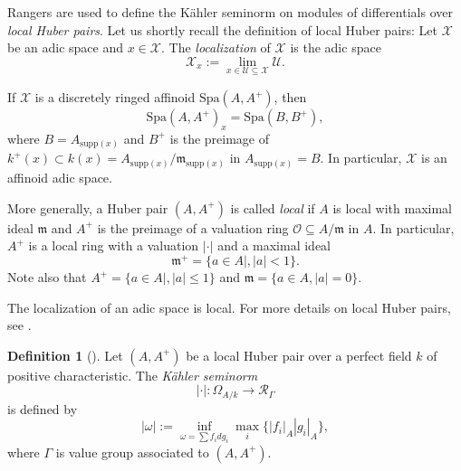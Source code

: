 \documentclass{amsart}
\def\Spa{\textrm{Spa}}
\theoremstyle{definition}
\newtheorem{definition}[theorem]{Definition}
\newcommand\supp{\mathrm{supp}}
\newcommand{\mX}{\mathcal{X}}
\newcommand{\mO}{\mathcal{O}}
\newcommand{\mU}{\mathcal{U}}
\newcommand{\mm}{\mathfrak{m}}
\numberwithin{equation}{section}
\begin{document}
Rangers are used to define the Kähler seminorm on modules of differentials over \textit{local Huber pairs}.  Let us shortly recall the definition of local Huber pairs: Let $\mX$ be an adic space and $x\in \mX$. The \textit{localization} of $\mX$ is the adic space
\[
\mX_x:= \lim\limits_{x\in \mU\subseteq \mX} \mU. 
\]

If $\mX$ is a discretely ringed affinoid $\Spa(A,A^+)$, then 
\[
	\Spa(A,A^+)_x=\Spa(B,B^+),
\]
where $B=A_{\supp(x)}$ and $B^+$ is the preimage of $k^+(x)\subset k(x)=A_{\supp(x)}/\mm_{\supp(x)} $ in $A_{\supp(x)}=B$. In particular, $\mX$ is an affinoid adic space. 

More generally, a Huber pair $(A,A^+)$ is called \textit{local} if $A$ is local with maximal ideal $\mm$  and $A^+$ is the preimage of a valuation ring $\mO \subseteq A/\mm$ in $A$. In particular, $A^+$ is a local ring with a valuation $|\cdot|$ and a maximal ideal
\[
\mm^+=\{a\in A|, |a|<1\}.
\]
Note also that $A^+=\{a\in A|,|a|\leq 1\}$ and $\mm=\{a\in A,|a|=0\}.$

The localization of an adic space is local. For more details on local Huber pairs, see  \cite[Section 10]{HSTame}. 



\begin{definition}[{\cite[§7]{LogDiff}}]\label{def:ValuationOmega}
	Let \( (A, A^+) \) be a local Huber pair over a perfect field \( k \) of positive characteristic. The \emph{Kähler seminorm}
	\[
	|\cdot|:\Omega_{A/k}\to \mathcal{R}_\Gamma
	\]
	is defined by
	\[
	|\omega|:= \inf\limits_{\omega=\sum f_idg_i}\max\limits_i\big\{ |f_i|_A|g_i|_A\big\},
	\]
	where $\Gamma$ is value group associated to $(A,A^+)$.
\end{definition}
\end{document}
